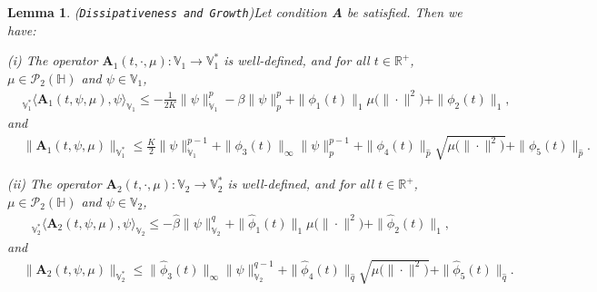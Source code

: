 \documentclass[11pt]{article}
\renewcommand{\leq}{\leqslant}
\newtheorem{lemma}[theorem]{Lemma}
\numberwithin{equation}{section}
\begin{document}
\begin{lemma}(\texttt{Dissipativeness and Growth})\label{Dissipativeness}
Let condition \textbf{A} be satisfied.
Then we have:

 (i) The operator $\mathbf{A}_1(t,\cdot,\mu):\mathbb{V}_1\rightarrow
\mathbb{V}_1^*$ is well-defined, and for all $t\in\mathbb{R}^+$,
$\mu\in\mathcal{P}_2
(\mathbb{H})$ and $\psi\in \mathbb{V}_1$,
\begin{align}\label{AAoperator1a}&
_{\mathbb{V}_1^*}\big\langle \mathbf{A}_1(t,\psi,\mu),
\psi\big\rangle_{\mathbb{V}_1}
\leq-\frac{1}{2K}\| \psi\|_{\dot{\mathbb{V}}_1}^p-
\beta\| \psi\|_p^{p} +\|\phi_1(t)
\|_1
\mu\big(\|\cdot\|^2\big)
+\|\phi_2(t)
\|_{1},
\end{align}
and
\begin{align}&\label{AAoperator1}
\|\mathbf{A}_1(t,\psi,\mu) \|_{\mathbb{V}^*_1}
\le\frac{K}{2}\| \psi
\|_{\dot{\mathbb{V}}_1
 }^{p-1}+\|\phi_3(t)
\|_\infty
\| \psi\|_p^{p-1}+\|\phi_4(t)
\|_{\widehat{p}}
\sqrt{\mu\big(\|\cdot\|^2\big)}
+\|\phi_5(t)
\|_{\widehat{p}}.
\end{align}




(ii) The operator $\mathbf{A}_2(t,\cdot,\mu):
\mathbb{V}_2\rightarrow
\mathbb{V}_2^*$ is well-defined, and for all $t\in\mathbb{R}^+$,
$\mu\in\mathcal{P}_2
(\mathbb{H})$ and $\psi\in \mathbb{V}_2$,
\begin{align}
&\label{aAAoperator1a}
_{\mathbb{V}^*_2}\big\langle \mathbf{A}_2(t,\psi,\mu),
\psi\big\rangle_{\mathbb{V}_2}
\leq-\widehat{\beta}\| \psi\|_{\mathbb{V}_2}^{q}+\|\widehat{\phi}_1(t)
\|_{1}
\mu\big(\|\cdot\|^2\big)
+\|\widehat{\phi}_2(t)
\|_{1},
\end{align}
and
\begin{align}
&\label{aAAAoperator1}
\|\mathbf{A}_2(t,\psi,\mu) \|_{\mathbb{V}^*_2}
\le \|\widehat{\phi}_3(t)
\|_{\infty}
\| \psi\|_{\mathbb{V}_2}^{q-1}+\|\widehat{\phi}_4(t)
\|_{\widehat{q}}
\sqrt{\mu\big(\|\cdot\|^2\big)}
+\|\widehat{\phi}_5(t)
\|_{\widehat{q}}.
\end{align}


\end{lemma}
\end{document}
